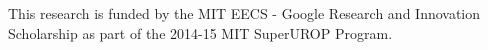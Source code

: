\documentclass[conference]{IEEEtran}
\begin{document}
This research is funded by the MIT EECS - Google Research and Innovation Scholarship as part of the 2014-15 MIT SuperUROP Program. 






%
%
%






%
%
\end{document}
